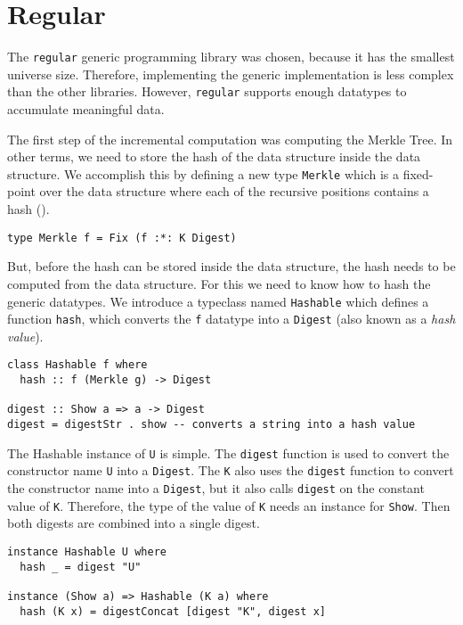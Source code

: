 \section{Regular}

The \texttt{regular} generic programming library was chosen, because it has the smallest universe size. Therefore, implementing the generic implementation is less complex than the other libraries. However, \texttt{regular} supports enough datatypes to accumulate meaningful data.


The first step of the incremental computation was computing the Merkle Tree. In other terms, we need to store the hash of the data structure inside the data structure. We accomplish this by defining a new type \texttt{Merkle} which is a fixed-point over the data structure where each of the recursive positions contains a hash ().

\begin{verbatim}
type Merkle f = Fix (f :*: K Digest)
\end{verbatim}

But, before the hash can be stored inside the data structure, the hash needs to be computed from the data structure. For this we need to know how to hash the generic datatypes. We introduce a typeclass named \texttt{Hashable} which defines a function \texttt{hash}, which converts the \texttt{f} datatype into a \texttt{Digest} (also known as a \textit{hash value}).

\begin{verbatim}
class Hashable f where
  hash :: f (Merkle g) -> Digest

digest :: Show a => a -> Digest
digest = digestStr . show -- converts a string into a hash value
\end{verbatim}

The Hashable instance of \texttt{U} is simple. The \texttt{digest} function is used to convert the constructor name \texttt{U} into a \texttt{Digest}. The \texttt{K} also uses the \texttt{digest} function to convert the constructor name into a \texttt{Digest}, but it also calls \texttt{digest} on the constant value of \texttt{K}. Therefore, the type of the value of \texttt{K} needs an instance for \texttt{Show}. Then both digests are combined into a single digest. 

\begin{verbatim}
instance Hashable U where
  hash _ = digest "U"

instance (Show a) => Hashable (K a) where
  hash (K x) = digestConcat [digest "K", digest x]
\end{verbatim}

